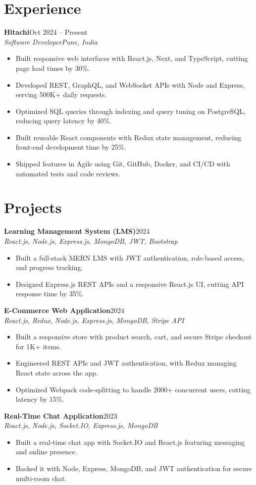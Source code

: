 \documentclass[letterpaper,10pt]{article}
\newcommand{\jobHeading}[4]{%
  \noindent\textbf{#1}\hfill\textcolor{secondary}{#2}\\
  {\itshape\color{secondary}#3}\hfill\textcolor{secondary}{\itshape #4}\\[-2pt]%
}
\newcommand{\projectHeading}[3]{%
  \noindent\textbf{#1}\hfill\textcolor{secondary}{#3}\\
  {\itshape\color{secondary}#2}\\[-2pt]%
}
\begin{document}
\section{Experience}
\jobHeading{Hitachi}{Oct 2024 -- Present}{Software Developer}{Pune, India}
\begin{itemize}
  \item Built responsive web interfaces with React.js, Next, and TypeScript, cutting page load times by 30\%.
  \item Developed REST, GraphQL, and WebSocket APIs with Node and Express, serving 500K+ daily requests.
  \item Optimized SQL queries through indexing and query tuning on PostgreSQL, reducing query latency by 40\%.
  \item Built reusable React components with Redux state management, reducing front-end development time by 25\%.
  \item Shipped features in Agile using Git, GitHub, Docker, and CI/CD with automated tests and code reviews.
\end{itemize}

\section{Projects}
\projectHeading{Learning Management System (LMS)}{React.js, Node.js, Express.js, MongoDB, JWT, Bootstrap}{2024}
\begin{itemize}
  \item Built a full-stack MERN LMS with JWT authentication, role-based access, and progress tracking.
  \item Designed Express.js REST APIs and a responsive React.js UI, cutting API response time by 35\%.
\end{itemize}

\projectHeading{E-Commerce Web Application}{React.js, Redux, Node.js, Express.js, MongoDB, Stripe API}{2024}
\begin{itemize}
  \item Built a responsive store with product search, cart, and secure Stripe checkout for 1K+ items.
  \item Engineered REST APIs and JWT authentication, with Redux managing React state across the app.
  \item Optimized Webpack code-splitting to handle 2000+ concurrent users, cutting latency by 15\%.
\end{itemize}

\projectHeading{Real-Time Chat Application}{React.js, Node.js, Socket.IO, Express.js, MongoDB}{2023}
\begin{itemize}
  \item Built a real-time chat app with Socket.IO and React.js featuring messaging and online presence.
  \item Backed it with Node, Express, MongoDB, and JWT authentication for secure multi-room chat.
\end{itemize}
\end{document}

